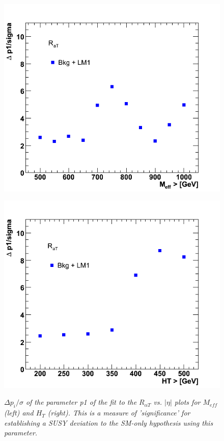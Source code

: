 \begin{figure}[h!]
\begin{minipage}[b]{0.5\linewidth}
\centering
{\label{fig:meff_p1_s}\includegraphics[scale=0.4]{./plots/Meff-NT7-p1-Sig}} 
\end{minipage}
\begin{minipage}[b]{0.5\linewidth}
\centering
{\label{fig:HT_p1_s}\includegraphics[scale=0.4]{./plots/HT-NT7-p1-Sig}} 
\end{minipage}
\caption{\small{\textit{ $\Delta p_{i} / \sigma$ of the parameter p1 of the fit to the $R_{\alpha T}$ vs. $|\eta|$ plots for $M_{eff}$ (left) and $H_{T}$ (right). This is a measure of 'significance' for establishing a SUSY deviation to the SM-only hypothesis using this parameter.} }}
\label{fig:meff6}
\end{figure}
